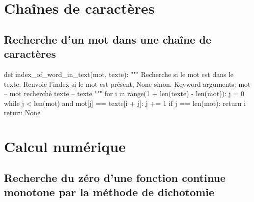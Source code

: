 \documentclass[10pt]{article}
\begin{document}
\section{Chaînes de caractères}
\subsection{Recherche d'un mot dans une chaîne de caractères}

\begin{py}
\begin{python}
def index_of_word_in_text(mot, texte):
    """ Recherche si le mot est dans le texte.
    Renvoie l'index si le mot est présent, None sinon.
    Keyword arguments:
    mot -- mot recherché
    texte -- texte
    """
    for i in range(1 + len(texte) - len(mot)):
        j = 0
        while j < len(mot) and mot[j] == texte[i + j]:
            j += 1
        if j == len(mot):
            return i
    return None
\end{python}
\end{py}


\section{Calcul numérique}
\subsection{Recherche du zéro d'une fonction continue monotone par la méthode de dichotomie}
\end{document}
